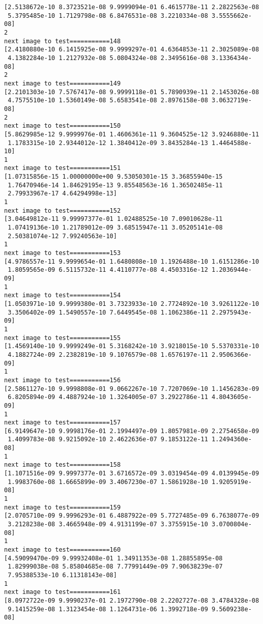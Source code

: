 \documentclass[11pt]{article}
\begin{document}
\begin{Verbatim}[commandchars=\\\{\}]
[2.5138672e-10 8.3723521e-08 9.9999094e-01 6.4615778e-11 2.2822563e-08
 5.3795485e-10 1.7129798e-08 6.8476531e-08 3.2210334e-08 3.5555662e-08]
2
next image to test===========148
[2.4180880e-10 6.1415925e-08 9.9999297e-01 4.6364853e-11 2.3025089e-08
 4.1382284e-10 1.2127932e-08 5.0804324e-08 2.3495616e-08 3.1336434e-08]
2
next image to test===========149
[2.2101303e-10 7.5767417e-08 9.9999118e-01 5.7890939e-11 2.1453026e-08
 4.7575510e-10 1.5360149e-08 5.6583541e-08 2.8976158e-08 3.0632719e-08]
2
next image to test===========150
[5.8629985e-12 9.9999976e-01 1.4606361e-11 9.3604525e-12 3.9246880e-11
 1.1783315e-10 2.9344012e-12 1.3840412e-09 3.8435284e-13 1.4464588e-10]
1
next image to test===========151
[1.07315856e-15 1.00000000e+00 9.53050301e-15 3.36855940e-15
 1.76470946e-14 1.84629195e-13 9.85548563e-16 1.36502485e-11
 2.79933967e-17 4.64294998e-13]
1
next image to test===========152
[3.04649812e-11 9.99997377e-01 1.02488525e-10 7.09010628e-11
 1.07419136e-10 1.21789012e-09 3.68515947e-11 3.05205141e-08
 2.50381074e-12 7.99240563e-10]
1
next image to test===========153
[4.9786557e-11 9.9999654e-01 1.6480808e-10 1.1926488e-10 1.6151286e-10
 1.8059565e-09 6.5115732e-11 4.4110777e-08 4.4503316e-12 1.2036944e-09]
1
next image to test===========154
[1.0503971e-10 9.9999380e-01 3.7323933e-10 2.7724892e-10 3.9261122e-10
 3.3506402e-09 1.5490557e-10 7.6449545e-08 1.1062386e-11 2.2975943e-09]
1
next image to test===========155
[1.4569140e-10 9.9999249e-01 5.3168242e-10 3.9218015e-10 5.5370331e-10
 4.1882724e-09 2.2382819e-10 9.1076579e-08 1.6576197e-11 2.9506366e-09]
1
next image to test===========156
[2.5861127e-10 9.9998808e-01 9.0662267e-10 7.7207069e-10 1.1456283e-09
 6.8205894e-09 4.4887924e-10 1.3264005e-07 3.2922786e-11 4.8043605e-09]
1
next image to test===========157
[6.9149647e-10 9.9998176e-01 2.1994497e-09 1.8057981e-09 2.2754658e-09
 1.4099783e-08 9.9215092e-10 2.4622636e-07 9.1853122e-11 1.2494360e-08]
1
next image to test===========158
[1.1071516e-09 9.9997377e-01 3.6716572e-09 3.0319454e-09 4.0139945e-09
 1.9983760e-08 1.6665899e-09 3.4067230e-07 1.5861928e-10 1.9205919e-08]
1
next image to test===========159
[2.0705710e-09 9.9996293e-01 6.4887922e-09 5.7727485e-09 6.7638077e-09
 3.2128238e-08 3.4665948e-09 4.9131199e-07 3.3755915e-10 3.0700804e-08]
1
next image to test===========160
[4.59099470e-09 9.99932408e-01 1.34911353e-08 1.28855895e-08
 1.82999038e-08 5.85804685e-08 7.77991449e-09 7.90638239e-07
 7.95388533e-10 6.11318143e-08]
1
next image to test===========161
[8.0972722e-09 9.9990237e-01 2.1972790e-08 2.2202727e-08 3.4784328e-08
 9.1415259e-08 1.3123454e-08 1.1264731e-06 1.3992718e-09 9.5609238e-08]

\end{Verbatim}
\end{document}
